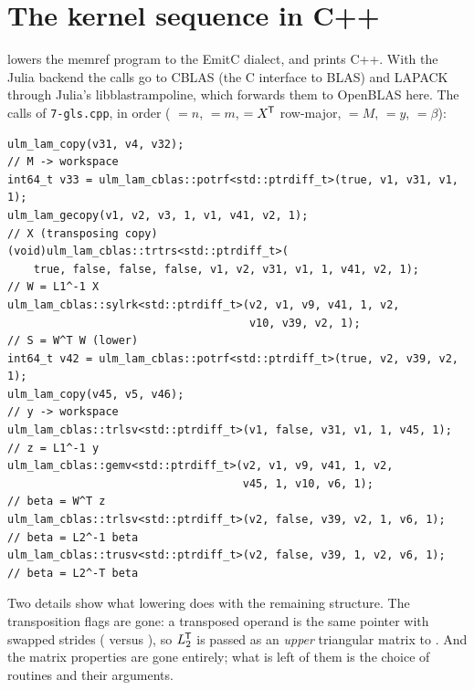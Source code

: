 \section{The kernel sequence in C++}
\label{sec:gls-kernels}

 lowers the memref program to the EmitC
dialect, and  prints C++. With the
Julia backend the calls go to CBLAS (the C interface to BLAS) and LAPACK
through Julia's libblastrampoline, which forwards them to OpenBLAS here. The
calls of \texttt{7-gls.cpp}, in order ( \(=n\),  \(=m\),
 \(=X^{\mkern-1.5mu\mathsf{T}}\) row-major,  \(=M\),  \(=y\),
 \(=\beta\)):

\begin{lstlisting}[style=cpp]
ulm_lam_copy(v31, v4, v32);                                          // M -> workspace
int64_t v33 = ulm_lam_cblas::potrf<std::ptrdiff_t>(true, v1, v31, v1, 1);
ulm_lam_gecopy(v1, v2, v3, 1, v1, v41, v2, 1);                       // X (transposing copy)
(void)ulm_lam_cblas::trtrs<std::ptrdiff_t>(
    true, false, false, false, v1, v2, v31, v1, 1, v41, v2, 1);      // W = L1^-1 X
ulm_lam_cblas::sylrk<std::ptrdiff_t>(v2, v1, v9, v41, 1, v2,
                                     v10, v39, v2, 1);               // S = W^T W (lower)
int64_t v42 = ulm_lam_cblas::potrf<std::ptrdiff_t>(true, v2, v39, v2, 1);
ulm_lam_copy(v45, v5, v46);                                          // y -> workspace
ulm_lam_cblas::trlsv<std::ptrdiff_t>(v1, false, v31, v1, 1, v45, 1);  // z = L1^-1 y
ulm_lam_cblas::gemv<std::ptrdiff_t>(v2, v1, v9, v41, 1, v2,
                                    v45, 1, v10, v6, 1);             // beta = W^T z
ulm_lam_cblas::trlsv<std::ptrdiff_t>(v2, false, v39, v2, 1, v6, 1);   // beta = L2^-1 beta
ulm_lam_cblas::trusv<std::ptrdiff_t>(v2, false, v39, 1, v2, v6, 1);   // beta = L2^-T beta
\end{lstlisting}

Two details show what lowering does with the remaining structure. The
transposition flags are gone: a transposed operand is the same pointer with
swapped strides ( versus ), so
\(L_2^{\mkern-1.5mu\mathsf{T}}\) is passed as an \emph{upper} triangular matrix to
. And the matrix properties are gone entirely; what is left of
them is the choice of routines and their  arguments.

